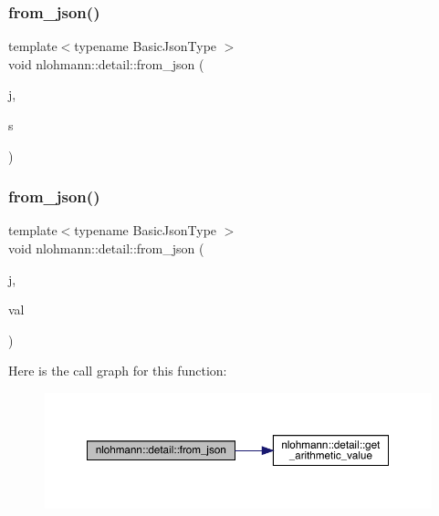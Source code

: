 \mbox{\label{namespacenlohmann_1_1detail_ad74d89f77ada7a57eff38b43d4bf2335}} 
\subsubsection{\texorpdfstring{from\_json()}{from\_json()}\hspace{0.1cm}{\footnotesize\ttfamily [2/11]}}
{\footnotesize\ttfamily template$<$typename Basic\+Json\+Type $>$ \\
void nlohmann\+::detail\+::from\+\_\+json (\begin{DoxyParamCaption}\item[{const Basic\+Json\+Type \&}]{j,  }\item[{typename Basic\+Json\+Type\+::string\+\_\+t \&}]{s }\end{DoxyParamCaption})}

\mbox{\label{namespacenlohmann_1_1detail_a7cb5dd7d46a60e65f9a8e0873b3f7dd8}} 
\subsubsection{\texorpdfstring{from\_json()}{from\_json()}\hspace{0.1cm}{\footnotesize\ttfamily [3/11]}}
{\footnotesize\ttfamily template$<$typename Basic\+Json\+Type $>$ \\
void nlohmann\+::detail\+::from\+\_\+json (\begin{DoxyParamCaption}\item[{const Basic\+Json\+Type \&}]{j,  }\item[{typename Basic\+Json\+Type\+::number\+\_\+float\+\_\+t \&}]{val }\end{DoxyParamCaption})}

Here is the call graph for this function\+:
\nopagebreak
\begin{figure}[H]
\begin{center}
\leavevmode
\includegraphics[width=350pt]{namespacenlohmann_1_1detail_a7cb5dd7d46a60e65f9a8e0873b3f7dd8_cgraph}
\end{center}
\end{figure}
\mbox{\label{namespacenlohmann_1_1detail_ace4d5680ba413d9fd897ccb5d9c61a1c}} 
